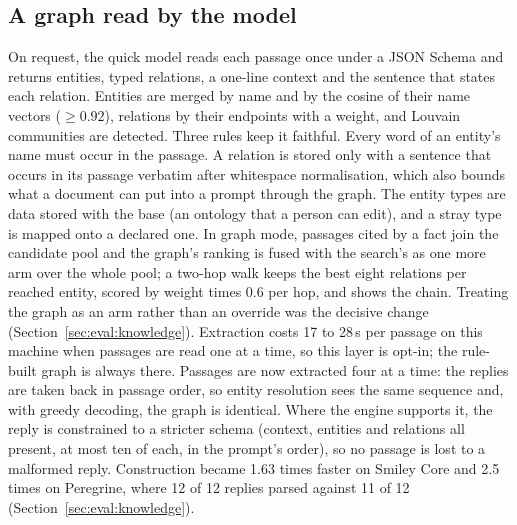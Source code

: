 \subsection{A graph read by the model}
\label{sec:kb:modelgraph}
On request, the quick model reads each passage once under a JSON Schema and
returns entities, typed relations, a one-line context and the sentence that
states each relation. Entities are merged by name and by the cosine of their
name vectors ($\ge0.92$), relations by their endpoints with a weight, and
Louvain communities are detected. Three rules keep it faithful. Every word of
an entity's name must occur in the passage. A relation is stored only with a
sentence that occurs in its passage verbatim after whitespace normalisation,
which also bounds what a document can put into a prompt through the graph.
The entity types are data stored with the base (an ontology that a person can
edit), and a stray type is mapped onto a declared one. In graph mode,
passages cited by a fact join the candidate pool and the graph's ranking is
fused with the search's as one more arm over the whole pool; a two-hop walk
keeps the best eight relations per reached entity, scored by weight times 0.6
per hop, and shows the chain. Treating the graph as an arm rather than an
override was the decisive change (Section~\ref{sec:eval:knowledge}).
Extraction costs 17 to 28\,s per passage on this machine when passages are
read one at a time, so this layer is opt-in; the rule-built graph is always
there. Passages are now extracted four at a time: the replies are taken back
in passage order, so entity resolution sees the same sequence and, with greedy
decoding, the graph is identical. Where the engine supports it, the reply is
constrained to a stricter schema (context, entities and relations all
present, at most ten of each, in the prompt's order), so no passage is lost to
a malformed reply. Construction became 1.63 times faster on Smiley Core and
2.5 times on Peregrine, where 12 of 12 replies parsed against 11 of 12
(Section~\ref{sec:eval:knowledge}).

